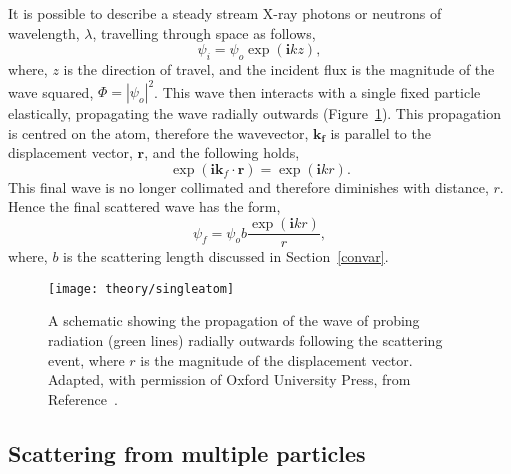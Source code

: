 It is possible to describe a steady stream X-ray photons or neutrons of wavelength, $\lambda$, travelling through space as follows,
%
\begin{equation}
    \psi_i = \psi_o \exp{(\mathbf{i} kz)},
    \label{equ:wave}
\end{equation}
%
where, $z$ is the direction of travel, and the incident flux is the magnitude of the wave squared, $\Phi = |\psi_o|^2$.
This wave then interacts with a single fixed particle elastically, propagating the wave radially outwards (Figure~\ref{fig:singleatom}).
This propagation is centred on the atom, therefore the wavevector, $\mathbf{k_f}$ is parallel to the displacement vector, $\mathbf{r}$, and the following holds,
%
\begin{equation}
    \exp{(\mathbf{i}\mathbf{k}_f\cdot \mathbf{r})} = \exp{(\mathbf{i}kr)}.
\end{equation}
%
This final wave is no longer collimated and therefore diminishes with distance, $r$.
Hence the final scattered wave has the form,
%
\begin{equation}
    \psi_f = \psi_o b\frac{\exp{(\mathbf{i}kr)}}{r},
\end{equation}
%
where, $b$ is the scattering length discussed in Section~\ref{convar}.
%
\begin{figure}
    \centering
    \texttt{[image: theory/singleatom]}
    \caption{A schematic showing the propagation of the wave of probing radiation (green lines) radially outwards following the scattering event, where $r$ is the magnitude of the displacement vector. Adapted, with permission of Oxford University Press\textsuperscript{\textcopyright}, from Reference~\cite{sivia_elementary_2011}.}
    \label{fig:singleatom}
\end{figure}
%

\subsection{Scattering from multiple particles}
\label{sec:multiscat}

